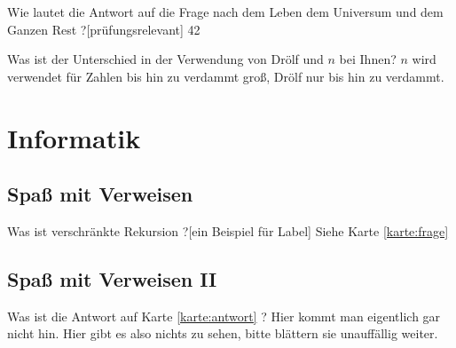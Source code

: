 \documentclass[a6paper,11pt,%
,toc
]{kartei}
\begin{document}
  \begin{karte}[Lebensphilosophie]{Wie lautet die Antwort auf die Frage nach dem Leben dem Universum und dem Ganzen Rest ?}[prüfungsrelevant]
  42
  \end{karte}
  \begin{karte}[Zahlenkunde]{Was ist der Unterschied in der Verwendung von Drölf und $n$ bei Ihnen?}
  $n$ wird verwendet für Zahlen bis hin zu verdammt groß, Drölf nur bis hin zu verdammt.
  \end{karte}
  \section{Informatik}
  \subsection{Spaß mit Verweisen}
  \renewcommand{\kommentarstil}{\textsc}
  \begin{karte}{Was ist verschränkte Rekursion ?}[ein Beispiel für Label]
  \label{karte:antwort} Siehe Karte \ref{karte:frage}
  \end{karte}
  \subsection{Spaß mit Verweisen II}
  \begin{karte}{Was ist die Antwort auf Karte \ref{karte:antwort} ?}
  \label{karte:frage}
    Hier kommt man eigentlich gar nicht hin. Hier gibt es also nichts zu sehen, bitte blättern sie unauffällig weiter.
  \end{karte}
\end{document}
